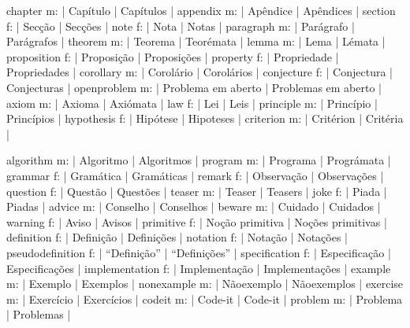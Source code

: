 \DefNoun  chapter           m: | Capítulo              | Capítulos               |
\DefNoun  appendix          m: | Apêndice              | Apêndices               |
\DefNoun  section           f: | Secção                | Secções                 |
\DefNoun  note              f: | Nota                  | Notas                   |
\DefNoun  paragraph         m: | Parágrafo             | Parágrafos              |
\DefNoun  theorem           m: | Teorema               | Teorémata               |
\DefNoun  lemma             m: | Lema                  | Lémata                  |
\DefNoun  proposition       f: | Proposição            | Proposições             |
\DefNoun  property          f: | Propriedade           | Propriedades            |
\DefNoun  corollary         m: | Corolário             | Corolários              |
\DefNoun  conjecture        f: | Conjectura            | Conjecturas             |
\DefNoun  openproblem       m: | {Problema em aberto}  | {Problemas em aberto}   |
\DefNoun  axiom             m: | Axioma                | Axiómata                |
\DefNoun  law               f: | Lei                   | Leis                    |
\DefNoun  principle         m: | Princípio             | Princípios              |
\DefNoun  hypothesis        f: | Hipótese              | Hipoteses               |
\DefNoun  criterion         m: | Critérion             | Critéria                |

\DefNoun  algorithm         m: | Algoritmo             | Algoritmos              |
\DefNoun  program           m: | Programa              | Prográmata              |
\DefNoun  grammar           f: | Gramática             | Gramáticas              |
\DefNoun  remark            f: | Observação            | Observações             |
\DefNoun  question          f: | Questão               | Questões                |
\DefNoun  teaser            m: | Teaser                | Teasers                 |
\DefNoun  joke              f: | Piada                 | Piadas                  |
\DefNoun  advice            m: | Conselho              | Conselhos               |
\DefNoun  beware            m: | Cuidado               | Cuidados                |
\DefNoun  warning           f: | Aviso                 | Avisos                  |
\DefNoun  primitive         f: | {Noção primitiva}     | {Noções primitivas}     |
\DefNoun  definition        f: | Definição             | Definições              |
\DefNoun  notation          f: | Notação               | Notações                |
\DefNoun  pseudodefinition  f: | ``Definição''         | ``Definições''          |
\DefNoun  specification     f: | Especificação         | Especificações          |
\DefNoun  implementation    f: | Implementação         | Implementações          |
\DefNoun  example           m: | Exemplo               | Exemplos                |
\DefNoun  nonexample        m: | Nãoexemplo            | Nãoexemplos             |
\DefNoun  exercise          m: | Exercício             | Exercícios              |
\DefNoun  codeit            m: | Code-it               | Code-it                 |
\DefNoun  problem           m: | Problema              | Problemas               |

